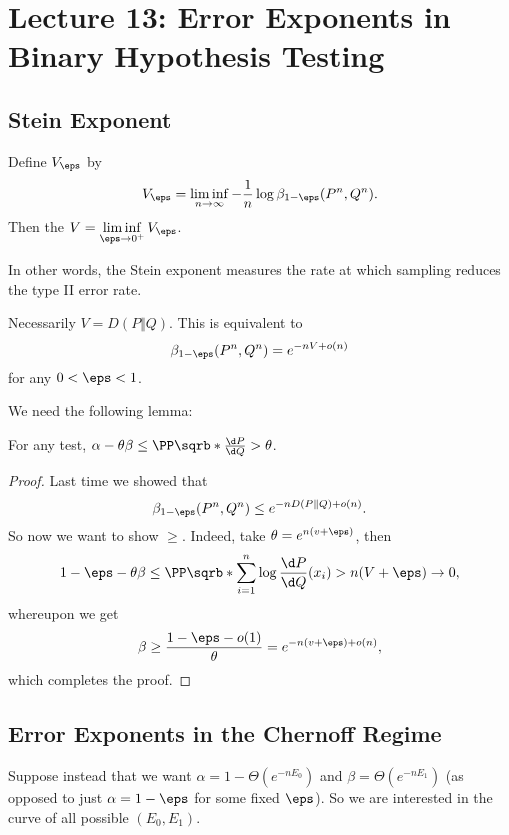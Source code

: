 \section*{Lecture 13: Error Exponents in Binary Hypothesis Testing}
\setcounter{section}{13}

\subsection{Stein Exponent}

\begin{defn}
	Define $V_\eps$ by \[
		V_\eps = \liminf_{n\to \infty} - \frac 1n \log \beta_{1-\eps} (P^n, Q^n).
	\]
	Then the  $V = \liminf\limits_{\eps\to 0^+} V_\eps$.
\end{defn}

In other words, the Stein exponent measures the rate at which sampling reduces the type II error rate.

\begin{thm}
	Necessarily $V = D(P\Vert Q)$. This is equivalent to \[
		\beta_{1-\eps}(P^n, Q^n) = e^{-nV + o(n)}
	\]
	for any $0 < \eps < 1$.
\end{thm}

We need the following lemma:

\begin{lem}
	For any test, $\alpha - \theta \beta \leq \PP\sqrb*{\frac{\d P}{\d Q} > \theta}$.
\end{lem}

\begin{proof}
	Last time we showed that \[
		\beta_{1-\eps} (P^n, Q^n) \leq e^{-nD(P\Vert Q) + o(n)}.
	\]
	So now we want to show $\geq$.
	Indeed, take $\theta = e^{n(v+\eps)}$, then \[
		1-\eps - \theta \beta \leq \PP\sqrb*{\sum_{i=1}^n \log \frac{\d P}{\d Q} (x_i) > n(V+\eps)}\to 0,
	\]whereupon we get \[
		\beta \geq \frac{1-\eps-o(1)}{\theta} = e^{-n(v+\eps)+o(n)},
	\]
	which completes the proof.
\end{proof}

\subsection{Error Exponents in the Chernoff Regime}

Suppose instead that we want $\alpha = 1-\Theta(e^{-nE_0})$ and $\beta = \Theta(e^{-nE_1})$ (as opposed to just $\alpha  = 1-\eps$ for some fixed $\eps$).
So we are interested in the curve of all possible $(E_0, E_1)$.

